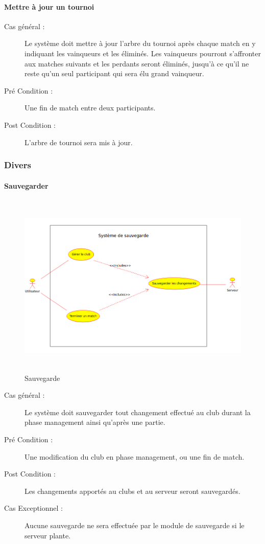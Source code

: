 \documentclass[a4paper]{article}
\begin{document}
\paragraph{Mettre à jour un tournoi}
\begin{description}
\item[Cas général :] Le système doit mettre à jour l'arbre du tournoi après chaque match en y indiquant les vainqueurs et les éliminés. Les vainqueurs pourront s'affronter aux matches suivants et les perdants seront éliminés, jusqu'à ce qu'il ne reste qu'un seul \gls{participant} qui sera élu grand vainqueur.
\item[Pré Condition  :] Une fin de match entre deux \glspl{participant}.
\item[Post Condition :] L'arbre de tournoi sera mis à jour.
\end{description}

\subsubsection{Divers}
\paragraph{Sauvegarder}
\begin{figure}[h]
   \caption{\label{1} Sauvegarde}
   \begin{center}
   \includegraphics[height=250pt]{uml/svg.png}
   \end{center}
\end{figure}
\begin{description}
\item[Cas général :] Le système doit sauvegarder tout changement effectué au \gls{club} durant la phase management ainsi qu'après une partie.
\item[Pré Condition  :] Une modification du \gls{club} en phase management, ou une fin de match.
\item[Post Condition :] Les changements apportés au \glspl{club} et au \gls{serveur} seront sauvegardés.
\item[Cas Exceptionnel :] Aucune sauvegarde ne sera effectuée par le module de sauvegarde si le \gls{serveur} plante.
\end{description}
\end{document}
